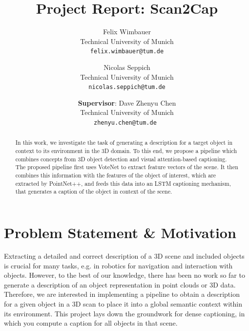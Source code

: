 \documentclass[10pt,twocolumn,letterpaper]{article}
\begin{document}
\title{Project Report: Scan2Cap}

\author{
\small Felix Wimbauer\\
\small Technical University of Munich\\
{\tt\small felix.wimbauer@tum.de}
\and
\small Nicolas Seppich\\
\small Technical University of Munich\\
{\tt\small nicolas.seppich@tum.de}
\and
\small
\textbf{Supervisor}: Dave Zhenyu Chen\\
\small
Technical University of Munich\\
{\tt\small zhenyu.chen@tum.de }
}

\maketitle

\begin{abstract}
In this work, we investigate the task of generating a description for a target object in context to its environment in the 3D domain. To this end, we propose a pipeline which combines concepts from 3D object detection and visual attention-based captioning. The proposed pipeline first uses VoteNet to extract feature vectors of the scene. It then combines this information with the features of the object of interest, which are extracted by PointNet++, and feeds this data into an LSTM captioning mechanism, that generates a caption of the object in context of the scene.\\{}
\end{abstract}

\section{Problem Statement \& Motivation}

Extracting a detailed and correct description of a 3D scene and included objects is crucial for many tasks, e.g. in robotics for navigation and interaction with objects.
However, to the best of our knowledge, there has been no work so far to generate a description of an object representation in point clouds or 3D data. Therefore, we are interested in implementing a pipeline to obtain a description for a given object in a 3D scan to place it into a global semantic context within its environment. This project lays down the groundwork for dense captioning, in which you compute a caption for all objects in that scene.
 
\end{document}
